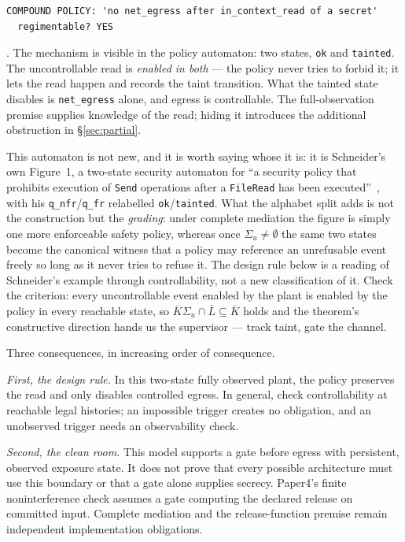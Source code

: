 \documentclass[11pt,a4paper]{article}  \usepackage{mdframed} \usepackage{graphicx} \usepackage{tabularx}
\begin{document}
\begin{verbatim}
COMPOUND POLICY: 'no net_egress after in_context_read of a secret'
  regimentable? YES
\end{verbatim}

. The mechanism is visible in the policy automaton: two states,
\texttt{ok} and \texttt{tainted}. The uncontrollable read is \emph{enabled in both} --- the policy never tries to forbid it;
it lets the read happen and records the taint transition. What the tainted state disables is \texttt{net\_\allowbreak egress} alone, and
egress is controllable. The full-observation premise supplies knowledge of
the read; hiding it introduces the additional obstruction in \S\ref{sec:partial}.

This automaton is not new, and it is worth saying whose it is: it is Schneider's own Figure~1, a two-state security automaton
for ``a security policy that prohibits execution of \texttt{Send} operations after a \texttt{FileRead} has been
executed''~\cite{schneider}, with his \texttt{q\_\allowbreak nfr}/\texttt{q\_\allowbreak fr} relabelled \texttt{ok}/\texttt{tainted}. What the
alphabet split adds is not the construction but the \emph{grading}: under complete mediation the figure is simply one more
enforceable safety policy, whereas once $\Sigma_u\neq\emptyset$ the same two states become the canonical witness that a
policy may reference an unrefusable event freely so long as it never tries to refuse it. The design rule below is a reading
of Schneider's example through controllability, not a new classification of it. Check the criterion: every uncontrollable event enabled by the plant is enabled by the policy in
every reachable state, so $\overline{K}\Sigma_u\cap\overline{L}\subseteq\overline{K}$ holds and the theorem's constructive
direction hands us the supervisor --- track taint, gate the channel.

Three consequences, in increasing order of consequence.

\emph{First, the design rule.} In this two-state fully observed plant, the
policy preserves the read and only disables controlled egress. In general,
check controllability at reachable legal histories; an impossible trigger
creates no obligation, and an unobserved trigger needs an observability check.

\emph{Second, the clean room.} This model supports a gate before egress with
persistent, observed exposure state. It does not prove that every possible
architecture must use this boundary or that a gate alone supplies secrecy.
Paper4's finite noninterference check assumes a gate computing the declared
release on committed input. Complete mediation and the release-function
premise remain independent implementation obligations.
\end{document}
